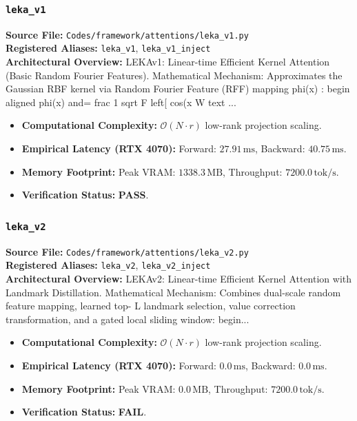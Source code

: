 \subsubsection{\texttt{leka\_v1}}
\textbf{Source File:} \texttt{Codes/framework/attentions/leka\_v1.py} \\
\textbf{Registered Aliases:} \texttt{leka\_v1}, \texttt{leka\_v1\_inject} \\
\textbf{Architectural Overview:} LEKAv1: Linear-time Efficient Kernel Attention (Basic Random Fourier Features). Mathematical Mechanism: Approximates the Gaussian RBF kernel via Random Fourier Feature (RFF) mapping phi(x) : begin aligned phi(x) and= frac 1 sqrt F left[ cos(x W text ...

\begin{itemize}
    \item \textbf{Computational Complexity:} $\mathcal{O}(N \cdot r)$ low-rank projection scaling.
    \item \textbf{Empirical Latency (RTX 4070):} Forward: $27.91\,\text{ms}$, Backward: $40.75\,\text{ms}$.
    \item \textbf{Memory Footprint:} Peak VRAM: $1338.3\,\text{MB}$, Throughput: $7200.0\,\text{tok/s}$.
    \item \textbf{Verification Status:} \textbf{PASS}.
\end{itemize}

\subsubsection{\texttt{leka\_v2}}
\textbf{Source File:} \texttt{Codes/framework/attentions/leka\_v2.py} \\
\textbf{Registered Aliases:} \texttt{leka\_v2}, \texttt{leka\_v2\_inject} \\
\textbf{Architectural Overview:} LEKAv2: Linear-time Efficient Kernel Attention with Landmark Distillation. Mathematical Mechanism: Combines dual-scale random feature mapping, learned top- L landmark selection, value correction transformation, and a gated local sliding window: begin...

\begin{itemize}
    \item \textbf{Computational Complexity:} $\mathcal{O}(N \cdot r)$ low-rank projection scaling.
    \item \textbf{Empirical Latency (RTX 4070):} Forward: $0.0\,\text{ms}$, Backward: $0.0\,\text{ms}$.
    \item \textbf{Memory Footprint:} Peak VRAM: $0.0\,\text{MB}$, Throughput: $7200.0\,\text{tok/s}$.
    \item \textbf{Verification Status:} \textbf{FAIL}.
\end{itemize}

